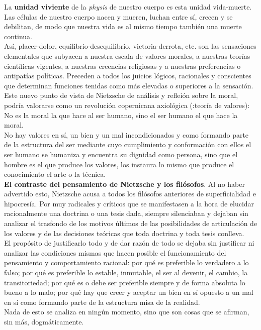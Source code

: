 \documentclass[a4paper, 10pt, twocolumn, spanish]{article}
\begin{document}
La \textbf{unidad viviente} de la \emph{physis} de nuestro cuerpo es esta unidad
vida-muerte. Las células de nuestro cuerpo nacen y mueren, luchan
entre sí, crecen y se debilitan, de modo que nuestra vida es al mismo
tiempo también una muerte continua.\\[0pt]
Así, placer-dolor, equilibrio-desequilibrio, victoria-derrota,
etc. son las sensaciones elementales que subyacen a nuestra escala de
valores morales, a nuestras teorías científicas vigentes, a nuestras
creencias religiosas y a nuestras preferencias o antipatías
políticas. Preceden a todos los juicios lógicos, racionales y
conscientes que determinan funciones tenidas como más elevadas o
superiores a la sensación.\\[0pt]

Este nuevo punto de vista de Nietzsche de análisis y refleión sobre la
moral, podría valorarse como un revolución copernicana axiológica
(:teoría de valores): No es la moral la que hace al ser humano, sino
el ser humano el que hace la moral.\\[0pt]
No hay valores en sí, un bien y un mal incondicionados y como formando
parte de la estructura del ser mediante cuyo cumplimiento y
conformación con ellos el ser humano se humaniza y encuentra su
dignidad como persona, sino que el hombre es el que produce los
valores, los instaura lo mismo que produce el conocimiento el arte o
la técnica.\\[0pt]

\textbf{El contraste del pensamiento de Nietzsche y los filósofos}.
Al no haber advertido esto, Nietzsche acusa a todos los filósofos
anteriores de superficialidad e hipocresía. Por muy radicales y
críticos que se manifestasen a la hora de elucidar racionalmente una
doctrina o una tesis dada, siempre silenciaban y dejaban sin analizar
el trasfondo de los motivos últimos de las posibilidades de
articulación de los valores y de las decisiones teóricas que toda
doctrina y toda tesis conlleva.\\[0pt]
El propósito de justificarlo todo y de dar razón de todo se dejaba sin
justificar ni analizar las condiciones mismas que hacen posible el
funcionamiento del pensamiento y comportamiento racional: por qué es
preferible lo verdadero a lo falso; por qué es preferible lo estable,
inmutable, el ser al devenir, el cambio, la transitoriedad; por qué es
o debe ser preferible siempre y de forma absoluta lo bueno a lo malo;
por qué hay que creer y aceptar un bien en sí opuesto a un mal en sí
como formando parte de la estructura misa de la realidad.\\[0pt]
Nada de esto se analiza en ningún momento, sino que son cosas que se
afirman, sin más, dogmáticamente.\\[0pt]
\end{document}
